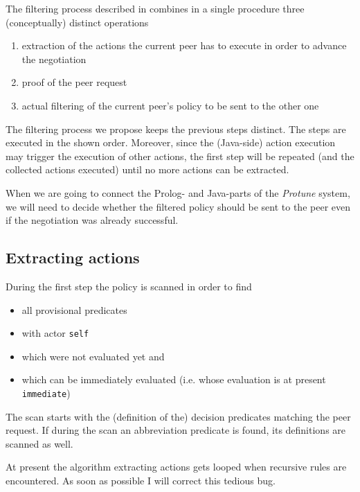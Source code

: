 \documentclass{article}
\begin{document}
The filtering process described in \cite{Denisa} combines in a single procedure three (conceptually) distinct operations

\begin{enumerate}
	\item extraction of the actions the current peer has to execute in order to advance the negotiation
	\item proof of the peer request
	\item actual filtering of the current peer's policy to be sent to the other one
\end{enumerate}

The filtering process we propose keeps the previous steps distinct. The steps are executed in the shown order. Moreover, since the (Java-side) action execution may trigger the execution of other actions, the first step will be repeated (and the collected actions executed) until no more actions can be extracted.

\begin{note}
When we are going to connect the Prolog- and Java-parts of the \textit{Protune} system, we will need to decide whether the filtered policy should be sent to the peer even if the negotiation was already successful.
\end{note}

\subsection{Extracting actions}

During the first step the policy is scanned in order to find

\begin{itemize}
	\item all provisional predicates
	\item with actor \texttt{self}
	\item which were not evaluated yet and
	\item which can be immediately evaluated (i.e. whose evaluation is at present \texttt{immediate})
\end{itemize}

The scan starts with the (definition of the) decision predicates matching the peer request. If during the scan an abbreviation predicate is found, its definitions are scanned as well.

\begin{note}
At present the algorithm extracting actions gets looped when recursive rules are encountered. As soon as possible I will correct this tedious bug.
\end{note}
\end{document}
